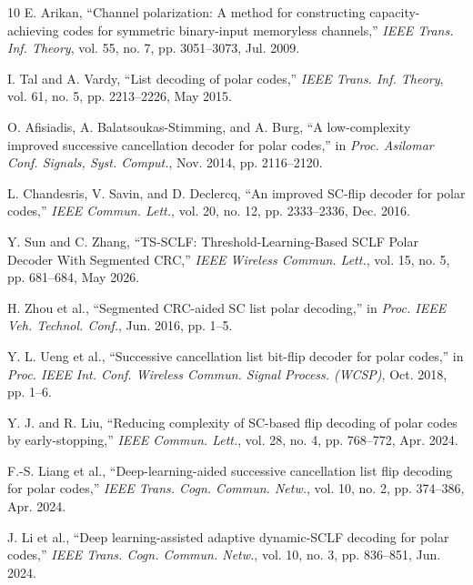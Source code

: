 \documentclass[journal,twocolumn]{IEEEtran}
\begin{document}
\begin{thebibliography}{10}
E. Arikan, ``Channel polarization: A method for constructing capacity-achieving codes for symmetric binary-input memoryless channels,'' \emph{IEEE Trans. Inf. Theory}, vol. 55, no. 7, pp. 3051--3073, Jul. 2009.

I. Tal and A. Vardy, ``List decoding of polar codes,'' \emph{IEEE Trans. Inf. Theory}, vol. 61, no. 5, pp. 2213--2226, May 2015.

O. Afisiadis, A. Balatsoukas-Stimming, and A. Burg, ``A low-complexity improved successive cancellation decoder for polar codes,'' in \emph{Proc. Asilomar Conf. Signals, Syst. Comput.}, Nov. 2014, pp. 2116--2120.

L. Chandesris, V. Savin, and D. Declercq, ``An improved SC-flip decoder for polar codes,'' \emph{IEEE Commun. Lett.}, vol. 20, no. 12, pp. 2333--2336, Dec. 2016.

Y. Sun and C. Zhang, ``TS-SCLF: Threshold-Learning-Based SCLF Polar Decoder With Segmented CRC,'' \emph{IEEE Wireless Commun. Lett.}, vol. 15, no. 5, pp. 681--684, May 2026.

H. Zhou et al., ``Segmented CRC-aided SC list polar decoding,'' in \emph{Proc. IEEE Veh. Technol. Conf.}, Jun. 2016, pp. 1--5.

Y. L. Ueng et al., ``Successive cancellation list bit-flip decoder for polar codes,'' in \emph{Proc. IEEE Int. Conf. Wireless Commun. Signal Process. (WCSP)}, Oct. 2018, pp. 1--6.

Y. J. and R. Liu, ``Reducing complexity of SC-based flip decoding of polar codes by early-stopping,'' \emph{IEEE Commun. Lett.}, vol. 28, no. 4, pp. 768--772, Apr. 2024.

F.-S. Liang et al., ``Deep-learning-aided successive cancellation list flip decoding for polar codes,'' \emph{IEEE Trans. Cogn. Commun. Netw.}, vol. 10, no. 2, pp. 374--386, Apr. 2024.

J. Li et al., ``Deep learning-assisted adaptive dynamic-SCLF decoding for polar codes,'' \emph{IEEE Trans. Cogn. Commun. Netw.}, vol. 10, no. 3, pp. 836--851, Jun. 2024.
\end{thebibliography}
\end{document}
